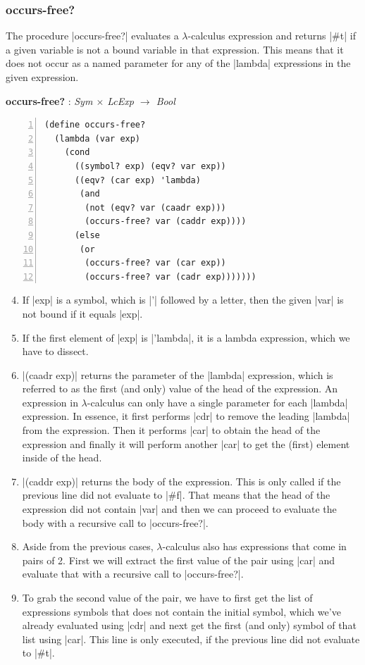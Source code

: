 \documentclass[a4paper]{article}
\begin{document}
\subsubsection{occurs-free?}

The procedure |occurs-free?| evaluates a $\lambda$-calculus expression and returns |#t| if a given variable is not a bound variable in that expression. This means that it does not occur as a named parameter for any of the |lambda| expressions in the given expression.

\textbf{occurs-free?} : \textit{Sym $\times$ LcExp $\rightarrow$ Bool}
\begin{lstlisting}[aboveskip=0pt,numbers=left]
(define occurs-free?
  (lambda (var exp)
    (cond
      ((symbol? exp) (eqv? var exp))
      ((eqv? (car exp) 'lambda)
       (and
        (not (eqv? var (caadr exp)))
        (occurs-free? var (caddr exp))))
      (else
       (or
        (occurs-free? var (car exp))
        (occurs-free? var (cadr exp)))))))
\end{lstlisting}


\begin{enumerate}
\setcounter{enumi}{3}
\item If |exp| is a symbol, which is |'| followed by a letter, then the given |var| is not bound if it equals |exp|.
\item If the first element of |exp| is |'lambda|, it is a lambda expression, which we have to dissect.
\setcounter{enumi}{6}
\item |(caadr exp)| returns the parameter of the |lambda| expression, which is referred to as the first (and only) value of the head of the expression. An expression in $\lambda$-calculus can only have a single parameter for each |lambda| expression. In essence, it first performs |cdr| to remove the leading |lambda| from the expression. Then it performs |car| to obtain the head of the expression and finally it will perform another |car| to get the (first) element inside of the head.
\item |(caddr exp)| returns the body of the expression. This is only called if the previous line did not evaluate to |#f|. That means that the head of the expression did not contain |var| and then we can proceed to evaluate the body with a recursive call to |occurs-free?|.
\setcounter{enumi}{10}
\item Aside from the previous cases, $\lambda$-calculus also has expressions that come in pairs of 2. First we will extract the first value of the pair using |car| and evaluate that with a recursive call to |occurs-free?|.
\item To grab the second value of the pair, we have to first get the list of expressions symbols that does not contain the initial symbol, which we've already evaluated using |cdr| and next get the first (and only) symbol of that list using |car|. This line is only executed, if the previous line did not evaluate to |#t|.
\end{enumerate}
\end{document}
